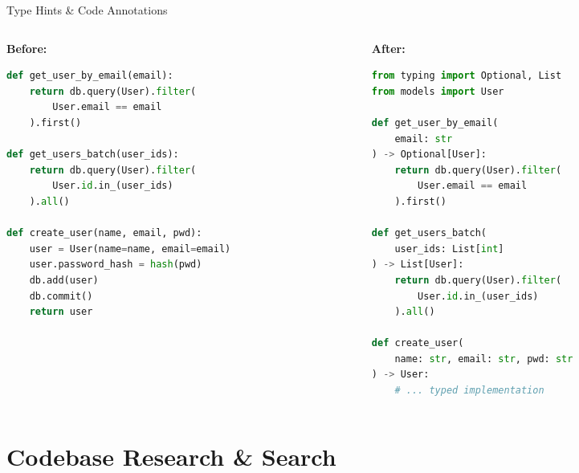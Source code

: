 \documentclass[aspectratio=169,11pt]{beamer}
\begin{document}
\begin{frame}[fragile]{Type Hints \& Code Annotations}
    \begin{columns}[T]
        \begin{column}{0.48\textwidth}
            \textbf{Before:}
            \begin{lstlisting}[language=python, basicstyle=\ttfamily\tiny]
def get_user_by_email(email):
    return db.query(User).filter(
        User.email == email
    ).first()

def get_users_batch(user_ids):
    return db.query(User).filter(
        User.id.in_(user_ids)
    ).all()

def create_user(name, email, pwd):
    user = User(name=name, email=email)
    user.password_hash = hash(pwd)
    db.add(user)
    db.commit()
    return user
            \end{lstlisting}
        \end{column}
        \begin{column}{0.48\textwidth}
            \textbf{After:}
            \begin{lstlisting}[language=python, basicstyle=\ttfamily\tiny]
from typing import Optional, List
from models import User

def get_user_by_email(
    email: str
) -> Optional[User]:
    return db.query(User).filter(
        User.email == email
    ).first()

def get_users_batch(
    user_ids: List[int]
) -> List[User]:
    return db.query(User).filter(
        User.id.in_(user_ids)
    ).all()

def create_user(
    name: str, email: str, pwd: str
) -> User:
    # ... typed implementation
            \end{lstlisting}
        \end{column}
    \end{columns}

\end{frame}

\section{Codebase Research \& Search}
\end{document}
